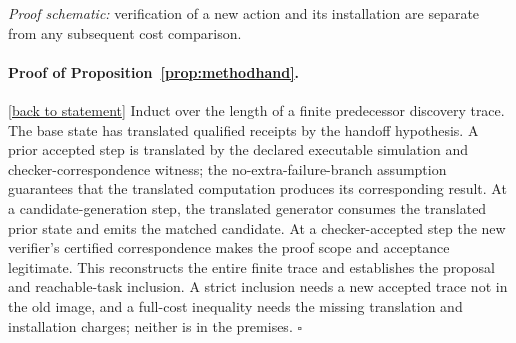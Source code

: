 \documentclass[11pt,letterpaper]{article}
\theoremstyle{definition}
\theoremstyle{remark}
\newcommand{\backlink}[1]{\hyperlink{claim:#1}{\footnotesize[back to statement]}}
\begin{document}
\begin{center}
\end{center}
\noindent\emph{Proof schematic:} verification of a new action and its installation are separate from any subsequent cost comparison.

\paragraph{Proof of Proposition~\ref{prop:methodhand}.}\hypertarget{proof:methodhand}{}\backlink{methodhand}
Induct over the length of a finite predecessor discovery trace. The base state has translated qualified receipts by the handoff hypothesis. A prior accepted step is translated by the declared executable simulation and checker-correspondence witness; the no-extra-failure-branch assumption guarantees that the translated computation produces its corresponding result. At a candidate-generation step, the translated generator consumes the translated prior state and emits the matched candidate. At a checker-accepted step the new verifier's certified correspondence makes the proof scope and acceptance legitimate. This reconstructs the entire finite trace and establishes the proposal and reachable-task inclusion. A strict inclusion needs a new accepted trace not in the old image, and a full-cost inequality needs the missing translation and installation charges; neither is in the premises. $\square$
\end{document}
